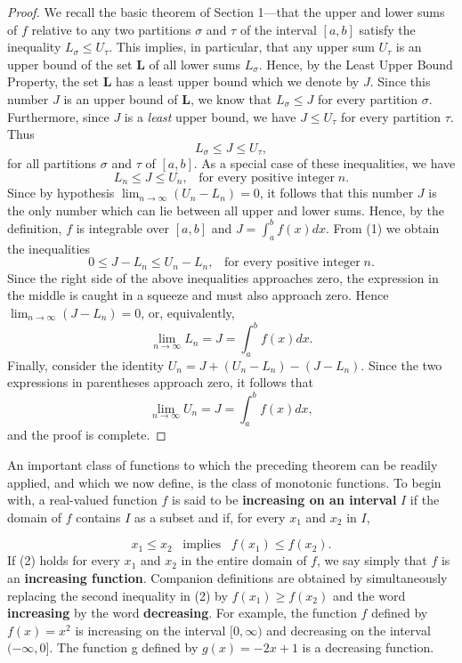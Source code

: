 \begin{proof}
We recall the basic theorem of Section 1---that the upper and lower sums of $f$ relative to any two partitions $\sigma$ and $\tau$ of the interval $[a, b]$ satisfy the inequality $L_\sigma \leq U_\tau$.  This implies, in particular, that any upper sum $U_{\tau}$ is an upper bound of the set \textbf{L} of all lower sums $L_{\sigma}$. Hence, by the Least Upper Bound Property, the set \textbf{L} has a least upper bound which we denote by $J$.  Since this number $J$ is an upper bound of \textbf{L}, we know that $L_\sigma \leq J$ for every partition $\sigma$.  Furthermore, since $J$ is a \textit{least} upper bound, we have $J \leq U_\tau$ for every partition $\tau$. Thus
$$
L_\sigma \leq J \leq U_\tau,
$$
for all partitions $\sigma$ and $\tau$ of $[a, b]$. As a special case of these inequalities, we have
\begin{equation}
L_{n} \leq J \leq U_{n}, \;\;\; \mbox{for every positive integer}\; n.  
\label{eq4.3.1}
\end{equation}
Since by hypothesis $\lim_{n \rightarrow \infty} (U_n - L_n) = 0$, it follows that this number $J$ is the only number which can lie between all upper and lower sums. Hence, by the definition, $f$ is integrable over $[a, b]$
and $J = \int_{a}^{b} f(x) dx$. From (1) we obtain the inequalities
$$
0 \leq J - L_n \leq U_n - L_n, \;\;\;\mbox{for every positive integer}\; n.
$$
Since the right side of the above inequalities approaches zero, the expression in the middle is caught in a squeeze and must also approach zero. Hence $\lim_{n \rightarrow \infty} (J - L_n) = 0$, or, equivalently,
$$
\lim_{n \rightarrow \infty} L_n = J = \int_{a}^{b} f(x) dx.
$$
Finally, consider the identity $U_n = J + (U_n - L_n) - (J - L_n)$. Since the two expressions in parentheses approach zero, it follows that
$$
\lim_{n \rightarrow \infty} U_n = J = \int_{a}^{b} f(x)dx, 
$$
and the proof is complete.
\end{proof}

An important class of functions to which the preceding theorem can be
readily applied, and which we now define, is the class of monotonic functions.
To begin with, a real-valued function $f$ is said to be \textbf{increasing on an interval} $I$ if the domain of $f$ contains $I$ as a subset and if, for every $x_1$ and $x_2$ in $I$,

\begin{equation}
x_1 \leq x_2 \;\;\;\mbox{implies}\;\;\; f(x_1) \leq f(x_2).  
\label{eq4.3.2}
\end{equation}
\noindent If (2) holds for every $x_1$ and $x_2$ in the entire domain of $f$, we say simply that $f$ is an \textbf{increasing function}. Companion definitions are obtained by simultaneously replacing the second inequality in (2) by $f(x_1) \geq f(x_2)$ and the word \textbf{increasing} by the word \textbf{decreasing}. For example, the function $f$ defined by $f(x) = x^2$ is increasing on the interval $[0, \infty)$ and decreasing on the interval $(-\infty, 0]$. The function g defined by $g(x) = - 2x + 1$ is a decreasing function.

